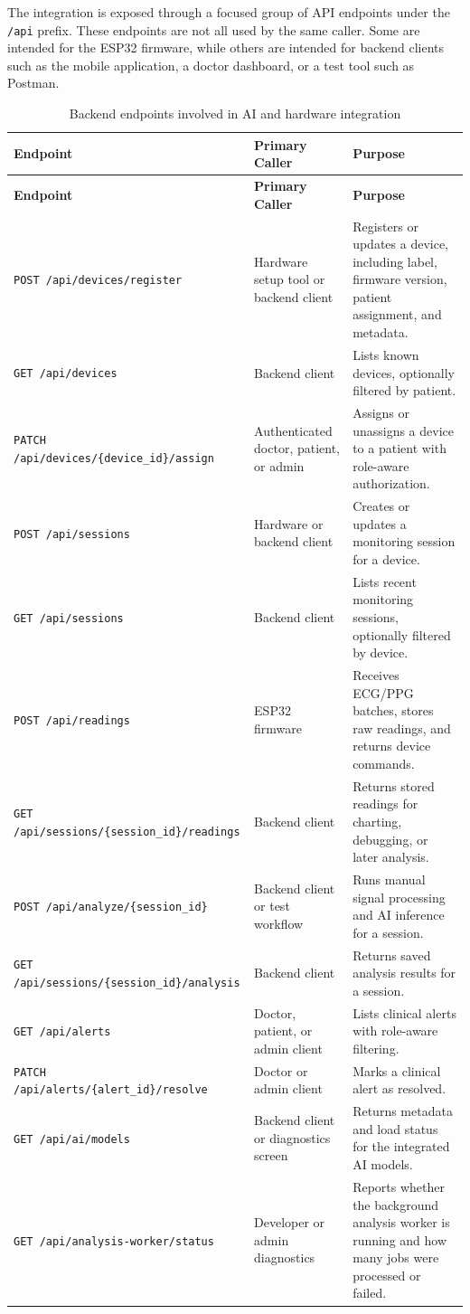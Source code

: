 The integration is exposed through a focused group of API endpoints under the \texttt{/api} prefix. These endpoints are not all used by the same caller. Some are intended for the ESP32 firmware, while others are intended for backend clients such as the mobile application, a doctor dashboard, or a test tool such as Postman.

\begin{longtable}{p{}p{}p{}}
\caption{Backend endpoints involved in AI and hardware integration}\\
\toprule
\textbf{Endpoint} & \textbf{Primary Caller} & \textbf{Purpose}\\
\midrule
\endfirsthead
\toprule
\textbf{Endpoint} & \textbf{Primary Caller} & \textbf{Purpose}\\
\midrule
\endhead
\texttt{POST /api/devices/register} & Hardware setup tool or backend client & Registers or updates a device, including label, firmware version, patient assignment, and metadata.\\
\texttt{GET /api/devices} & Backend client & Lists known devices, optionally filtered by patient.\\
\texttt{PATCH /api/devices/\{device\_id\}/assign} & Authenticated doctor, patient, or admin & Assigns or unassigns a device to a patient with role-aware authorization.\\
\texttt{POST /api/sessions} & Hardware or backend client & Creates or updates a monitoring session for a device.\\
\texttt{GET /api/sessions} & Backend client & Lists recent monitoring sessions, optionally filtered by device.\\
\texttt{POST /api/readings} & ESP32 firmware & Receives ECG/PPG batches, stores raw readings, and returns device commands.\\
\texttt{GET /api/sessions/\{session\_id\}/readings} & Backend client & Returns stored readings for charting, debugging, or later analysis.\\
\texttt{POST /api/analyze/\{session\_id\}} & Backend client or test workflow & Runs manual signal processing and AI inference for a session.\\
\texttt{GET /api/sessions/\{session\_id\}/analysis} & Backend client & Returns saved analysis results for a session.\\
\texttt{GET /api/alerts} & Doctor, patient, or admin client & Lists clinical alerts with role-aware filtering.\\
\texttt{PATCH /api/alerts/\{alert\_id\}/resolve} & Doctor or admin client & Marks a clinical alert as resolved.\\
\texttt{GET /api/ai/models} & Backend client or diagnostics screen & Returns metadata and load status for the integrated AI models.\\
\texttt{GET /api/analysis-worker/status} & Developer or admin diagnostics & Reports whether the background analysis worker is running and how many jobs were processed or failed.\\
\bottomrule
\end{longtable}

